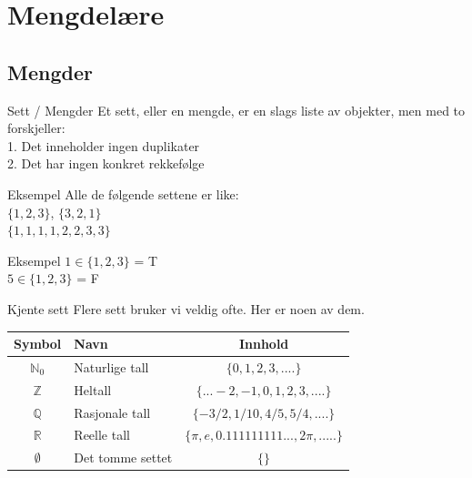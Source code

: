 \section{Mengdelære}
\subsection{Mengder}
\begin{frame}{Sett / Mengder}
    Et sett, eller en mengde, er en slags liste av objekter, men med to forskjeller:\\
    \indent \hspace{3mm}    1. Det inneholder ingen duplikater\\
    \indent \hspace{3mm}    2. Det har ingen konkret rekkefølge
    
    \pause
    \begin{block}{Eksempel}
        Alle de følgende settene er like: \\
        $\{1, 2, 3\}$, $\{3, 2, 1\}$ \\
        $\{1, 1, 1, 1, 2, 2, 3, 3\}$
    \end{block}
    
    \pause
    \begin{block}{Eksempel}
        $1 \in \{1, 2, 3\}$ = T \\
        $5 \in \{1, 2, 3\}$ = F
    \end{block}
\end{frame}


\begin{frame}{Kjente sett}
    Flere sett bruker vi veldig ofte. Her er noen av dem.\\
    
    \begin{tabular}{c|l|c}
        Symbol & Navn & Innhold \\ \hline
        $\mathbb{N}_0$ & Naturlige tall & $\{0, 1, 2, 3, ....\}$\\
        $\mathbb{Z}$ & Heltall & $\{... -2, -1, 0, 1, 2, 3, ....\}$\\
        $\mathbb{Q}$ & Rasjonale tall & $\{-3/2, 1/10, 4/5, 5/4, ....\}$\\
        $\mathbb{R}$ & Reelle tall & $\{\pi, e, 0.111111111..., 2\pi, .....\}$\\
        $\emptyset$ & Det tomme settet & $\{\}$
    \end{tabular}
    
\end{frame}

